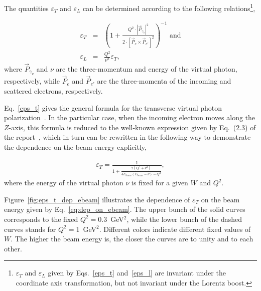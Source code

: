 The quantities $\varepsilon_{T}$ and $\varepsilon_{L}$ can be determined according to the following relations\footnote[7]{ $\varepsilon_{T}$ and $\varepsilon_{L}$ given by Eqs.~\eqref{eps_t} and~\eqref{eps_l}  are invariant under the coordinate axis transformation, but not invariant under the Lorentz boost.},

\begin{eqnarray}
\varepsilon_{T}& = &\left( 1 + \frac{Q^{2}\cdot |\overrightarrow{P}_{\gamma_{v}}|^{2}}{2\cdot[\overrightarrow{P}_{e}\times \overrightarrow{P}_{e'} ]^{2}}  \right)^{-1} \textrm{~and}\label{eps_t}\\
\varepsilon_{L}& = &\frac{Q^2}{\nu^2}\varepsilon_{T}\label{eps_l},
\end{eqnarray}
where $\overrightarrow{P}_{\gamma_{v}}$ and $\nu$ are the three-momentum and energy of the virtual photon, respectively, while $\overrightarrow{P}_{e}$ and $\overrightarrow{P}_{e'}$ are the three-momenta of the incoming and scattered electrons, respectively.





Eq.~\eqref{eps_t} gives the general formula for the transverse virtual photon polarization~\cite{Schilling:1973ag}. In the particular case, when the incoming electron moves along the $Z$-axis, this formula is reduced to the well-known expression given by Eq.~(2.3) of the report~\cite{twopeg}, which in turn can be rewritten in the following way to demonstrate the dependence on the beam energy explicitly,

\begin{eqnarray}
\varepsilon_{T} = \frac{1}{1+\frac{2(Q^2+\nu^{2})}{4E_{beam}(E_{beam}-\nu)-Q^2}},\label{eq:dep_on_ebeam}
\end{eqnarray}
where the energy of the virtual photon $\nu$ is fixed for a given $W$ and $Q^2$.

Figure~\ref{fig:eps_t_dep_ebeam} illustrates the dependence of $\varepsilon_{T}$ on the beam energy given by Eq.~\eqref{eq:dep_on_ebeam}. The upper bunch of the solid curves corresponds to the fixed $Q^{2} = 0.3$~GeV$^2$, while the lower bunch of the dashed curves stands for  $Q^{2} = 1$~GeV$^2$. Different colors indicate different fixed values of $W$. The higher the beam energy is, the closer the curves are to unity and to each other.

\clearpage


